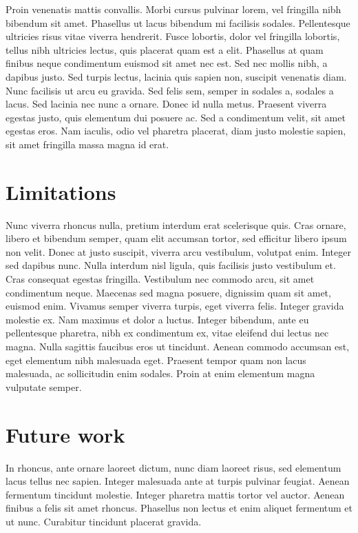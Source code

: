Proin venenatis mattis convallis. Morbi cursus pulvinar lorem, vel fringilla nibh bibendum sit amet. Phasellus ut lacus bibendum mi facilisis sodales. Pellentesque ultricies risus vitae viverra hendrerit. Fusce lobortis, dolor vel fringilla lobortis, tellus nibh ultricies lectus, quis placerat quam est a elit. Phasellus at quam finibus neque condimentum euismod sit amet nec est. Sed nec mollis nibh, a dapibus justo. Sed turpis lectus, lacinia quis sapien non, suscipit venenatis diam. Nunc facilisis ut arcu eu gravida. Sed felis sem, semper in sodales a, sodales a lacus. Sed lacinia nec nunc a ornare. Donec id nulla metus. Praesent viverra egestas justo, quis elementum dui posuere ac. Sed a condimentum velit, sit amet egestas eros. Nam iaculis, odio vel pharetra placerat, diam justo molestie sapien, sit amet fringilla massa magna id erat. 

\section{Limitations}

Nunc viverra rhoncus nulla, pretium interdum erat scelerisque quis. Cras ornare, libero et bibendum semper, quam elit accumsan tortor, sed efficitur libero ipsum non velit. Donec at justo suscipit, viverra arcu vestibulum, volutpat enim. Integer sed dapibus nunc. Nulla interdum nisl ligula, quis facilisis justo vestibulum et. Cras consequat egestas fringilla. Vestibulum nec commodo arcu, sit amet condimentum neque. Maecenas sed magna posuere, dignissim quam sit amet, euismod enim. Vivamus semper viverra turpis, eget viverra felis. Integer gravida molestie ex. Nam maximus et dolor a luctus. Integer bibendum, ante eu pellentesque pharetra, nibh ex condimentum ex, vitae eleifend dui lectus nec magna. Nulla sagittis faucibus eros ut tincidunt. Aenean commodo accumsan est, eget elementum nibh malesuada eget. Praesent tempor quam non lacus malesuada, ac sollicitudin enim sodales. Proin at enim elementum magna vulputate semper. 

\section{Future work}



In rhoncus, ante ornare laoreet dictum, nunc diam laoreet risus, sed elementum lacus tellus nec sapien. Integer malesuada ante at turpis pulvinar feugiat. Aenean fermentum tincidunt molestie. Integer pharetra mattis tortor vel auctor. Aenean finibus a felis sit amet rhoncus. Phasellus non lectus et enim aliquet fermentum et ut nunc. Curabitur tincidunt placerat gravida.

